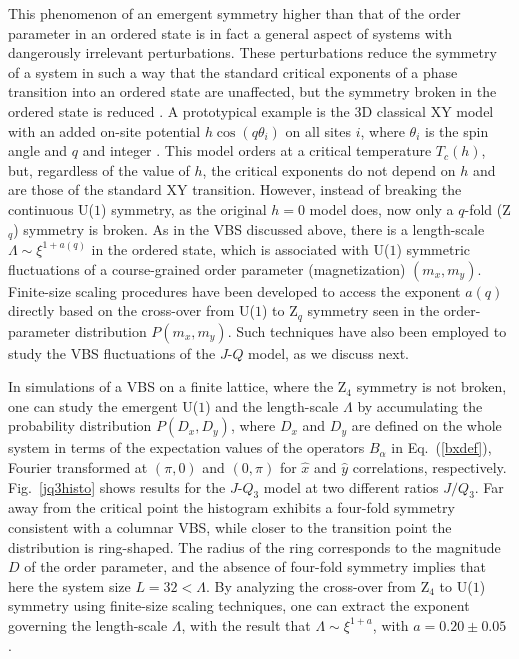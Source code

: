 \documentclass[range]{ar2e}
\begin{document}
This phenomenon of an emergent symmetry higher than that of the order parameter in an ordered state is in fact a general aspect of systems with 
dangerously irrelevant perturbations. These perturbations reduce the symmetry of a system in such a way that the standard critical exponents 
of a phase transition into an ordered state are unaffected, but the symmetry broken in the ordered state is reduced \cite{Jose77,Oshikawa00}. A 
prototypical example is the 3D classical XY model with an added on-site potential $h\cos(q\theta_i)$ on all sites $i$, where $\theta_i$ is the spin 
angle and $q$ and integer \cite{Carmona00}. This model orders at a critical temperature $T_c(h)$, but, regardless of the value of $h$, the critical exponents 
do not depend on $h$ and are those of the standard XY transition. However, instead of breaking the continuous U($1$) symmetry, as the original $h=0$ model does, 
now only a $q$-fold (Z$_q$) symmetry is broken. As in the VBS discussed above, there is a length-scale $\Lambda \sim \xi^{1+a(q)}$ in the ordered state, which 
is associated with U($1$) symmetric fluctuations of a course-grained order parameter (magnetization) $(m_x,m_y)$. Finite-size scaling procedures have been 
developed \cite{Lou07} to access the exponent $a(q)$ directly based on the cross-over from U($1$) to Z$_q$ symmetry seen in the order-parameter distribution 
$P(m_x,m_y)$. Such techniques have also been employed to study the VBS fluctuations of the $J$-$Q$ model, as we discuss next.

In simulations of a VBS on a finite lattice, where the Z$_4$ symmetry is not broken, one can study the emergent U($1$) and the length-scale
$\Lambda$ by accumulating the probability distribution $P(D_x,D_y)$, where $D_x$ and $D_y$ are defined on the whole system in terms of the expectation
values of the operators $B_\alpha$ in Eq.~(\ref{bxdef}), Fourier transformed at $(\pi,0)$ and $(0,\pi)$ for $\hat x$ and $\hat y$ correlations, respectively.
Fig.~\ref{jq3histo} shows results for the $J$-$Q_3$ model at two different ratios $J/Q_3$. Far away from the critical point the histogram exhibits a four-fold
symmetry consistent with a columnar VBS, while closer to the transition point the distribution is ring-shaped. The radius of the ring corresponds
to the magnitude $D$ of the order parameter, and the absence of four-fold symmetry implies that here the system size $L=32 < \Lambda$. By analyzing the
cross-over from Z$_4$ to U($1$) symmetry using finite-size scaling techniques, one can extract the exponent governing the length-scale $\Lambda$, with 
the result that $\Lambda \sim \xi^{1+a}$, with $a=0.20 \pm 0.05$ \cite{lou2009:sun}.
\end{document}
